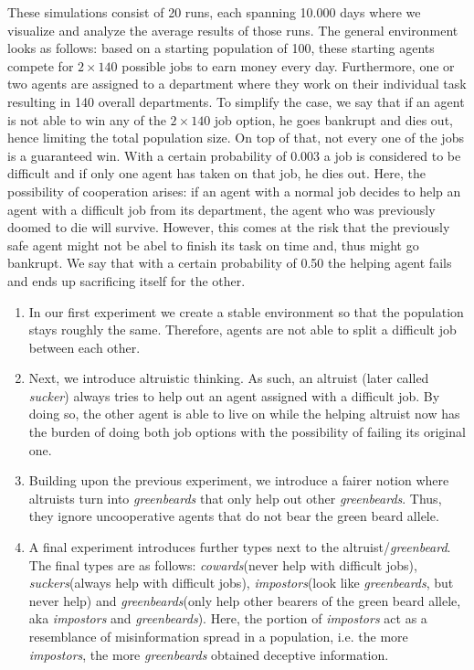 \documentclass[sigconf]{acmart}
\newcommand{\VNumSimulations}{20\xspace}
\newcommand{\VNumDays}{10.000\xspace}
\newcommand{\VNumPop}{100\xspace}
\newcommand{\VNumTrees}{140\xspace}
\newcommand{\VProbPredator}{0.003\xspace}
\newcommand{\VProbAltruistDies}{0.50\xspace}
\newcommand{\cowards}{\textit{cowards}\xspace}
\newcommand{\suckers}{\textit{suckers}\xspace}
\newcommand{\sucker}{\textit{sucker}\xspace}
\newcommand{\impostors}{\textit{impostors}\xspace}
\newcommand{\greenbeards}{\textit{greenbeards}\xspace}
\newcommand{\greenbeard}{\textit{greenbeard}\xspace}
\begin{document}
    These simulations consist of \VNumSimulations runs, each spanning \VNumDays days where we visualize and analyze the average results of those runs.
    The general environment looks as follows: based on a starting population of \VNumPop, these starting agents compete for $2 \times \VNumTrees$ possible jobs to earn money every day.
    Furthermore, one or two agents are assigned to a department where they work on their individual task resulting in \VNumTrees overall departments.
    To simplify the case, we say that if an agent is not able to win any of the $2 \times \VNumTrees$ job option, he goes bankrupt and dies out, hence limiting the total population size.
    On top of that, not every one of the jobs is a guaranteed win.
    With a certain probability of \VProbPredator a job is considered to be difficult and if only one agent has taken on that job, he dies out.
    Here, the possibility of cooperation arises: if an agent with a normal job decides to help an agent with a difficult job from its department, the agent who was previously doomed to die will survive.
    However, this comes at the risk that the previously safe agent might not be abel to finish its task on time and, thus might go bankrupt.
    We say that with a certain probability of \VProbAltruistDies the helping agent fails and ends up sacrificing itself for the other.


    \begin{enumerate}
        \item In our first experiment we create a stable environment so that the population stays roughly the same.
        Therefore, agents are not able to split a difficult job between each other.

        \item Next, we introduce altruistic thinking.
        As such, an altruist (later called \sucker) always tries to help out an agent assigned with a difficult job.
        By doing so, the other agent is able to live on while the helping altruist now has the burden of doing both job options with the possibility of failing its original one.

        \item Building upon the previous experiment, we introduce a fairer notion where altruists turn into \greenbeards that only help out other \greenbeards.
        Thus, they ignore uncooperative agents that do not bear the green beard allele.

        \item A final experiment introduces further types next to the altruist/\greenbeard.
        The final types are as follows: \cowards (never help with difficult jobs), \suckers (always help with difficult jobs), \impostors (look like \greenbeards, but never help) and \greenbeards (only help other bearers of the green beard allele, aka \impostors and \greenbeards).
        Here, the portion of \impostors act as a resemblance of misinformation spread in a population, i.e. the more \impostors, the more \greenbeards obtained deceptive information.

    \end{enumerate}
\end{document}

